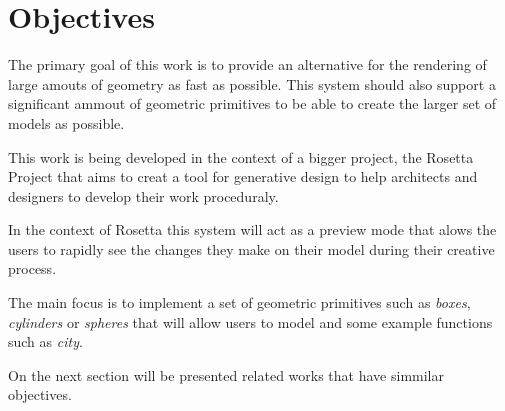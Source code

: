 
% 
% 

\section{Objectives}
\label{sec:objectives}

The primary goal of this work is to provide an alternative for the rendering of large amouts of geometry as fast as possible. This system should also support a significant ammout of geometric primitives to be able to create the larger set of models as possible.

This work is being developed in the context of a bigger project, the Rosetta Project that aims to creat a tool for generative design to help architects and designers to develop their work proceduraly. 

In the context of Rosetta this system will act as a preview mode that alows the users to rapidly see the changes they make on their model during their creative process.

The main focus is to implement a set of geometric primitives such as \emph{boxes}, \emph{cylinders} or \emph{spheres} that will allow users to model and some example functions such as \emph{city}.


On the next section will be presented related works that have simmilar objectives.



